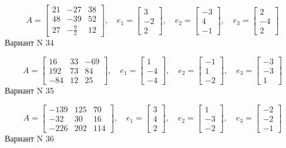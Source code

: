 \documentclass[11pt]{report}
\begin{document}
$$A = \left[\begin{matrix}21 & -27 & 38\\48 & -39 & 52\\27 & - \frac{9}{2} & 12\end{matrix}\right],\quad e_1 = \left[\begin{matrix}3\\-2\\2\end{matrix}\right],\quad e_2 = \left[\begin{matrix}-3\\4\\-1\end{matrix}\right],\quad e_3 = \left[\begin{matrix}2\\-4\\2\end{matrix}\right]$$Вариант N 34

$$A = \left[\begin{matrix}16 & 33 & -69\\192 & 73 & 84\\-84 & 12 & 25\end{matrix}\right],\quad e_1 = \left[\begin{matrix}1\\-4\\-4\end{matrix}\right],\quad e_2 = \left[\begin{matrix}-1\\1\\-2\end{matrix}\right],\quad e_3 = \left[\begin{matrix}-3\\-3\\1\end{matrix}\right]$$Вариант N 35

$$A = \left[\begin{matrix}-139 & 125 & 70\\-32 & 30 & 16\\-226 & 202 & 114\end{matrix}\right],\quad e_1 = \left[\begin{matrix}3\\4\\2\end{matrix}\right],\quad e_2 = \left[\begin{matrix}1\\-3\\-2\end{matrix}\right],\quad e_3 = \left[\begin{matrix}-2\\-2\\-1\end{matrix}\right]$$Вариант N 36
\end{document}
